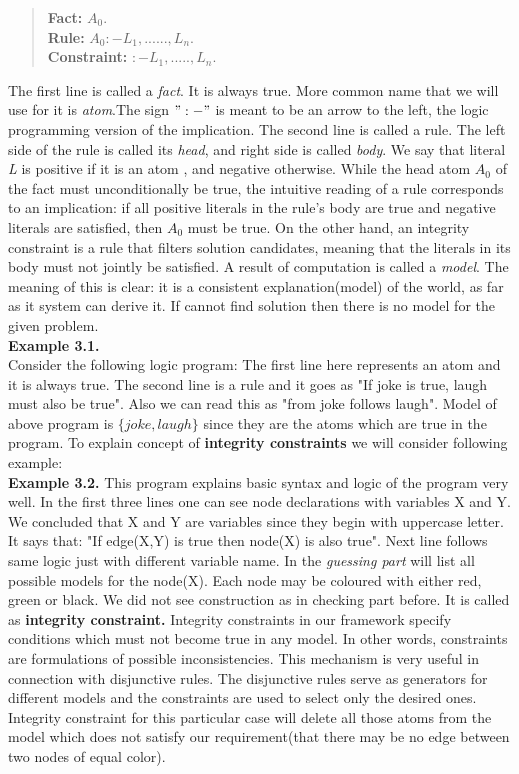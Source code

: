 \documentclass[14pt,a4paper, titlepage]{article}
\begin{document}
\begin{quote} 
\centering 
\textbf{Fact:} $ A_0. $ 
\\ \textbf{Rule:} $ A_0  :-  L_1,......,L_n.$
\\ \textbf{Constraint:} $  :-  L_1,.....,L_n.$
\end{quote}
The first line is called a \textit{fact}. It is always true. More common name that we will use for it is \textit{atom}.The sign $":-"$ is meant to be an arrow to the left, the logic programming version of the implication. 
The second line is called a rule. The left side of the rule is called its \textit{head}, and right side is called \textit{body}.
We say that literal \textit{L} is positive if it is an atom , and negative otherwise. While the head atom $A_0$ of the fact must unconditionally be true, the intuitive reading of a rule corresponds to an implication: if all positive literals in the rule's body are true and negative literals are satisfied, then $A_0$ must be true. On the other hand, an integrity constraint is a rule that filters solution candidates, meaning that the literals in its body must not jointly be satisfied. A result of \dlvhex{} computation is called a \textit{model}. The meaning of this is clear: it is a consistent explanation(model) of the world, as far as it system can derive it. If \dlvhex{} cannot find solution then there is no model for the given problem. \\ \textbf{Example 3.1.} \medskip \\Consider the following logic program: The first line here represents an atom and it is always true. The second line is a rule and it goes as "If joke is true, laugh must also be true". Also we can read this as "from joke follows laugh". Model of above program is $\{joke, laugh\}$ since they are the atoms which are true in the program. To explain concept of \textbf{integrity constraints} we will consider following example:\medskip \\ \textbf{Example 3.2.}
This program explains basic syntax and logic of the program very well. In the first three lines one can see node declarations with variables X and Y. We concluded that X and Y are variables since they begin with uppercase letter. It says that: "If edge(X,Y) is true then node(X) is also true". Next line follows same logic just with different variable name. In the \textit{guessing part} \dlvhex{} will list all possible models for the node(X). Each node may be coloured with either red, green or black. We did not see construction as in checking part before. It is called as \textbf{integrity constraint.} Integrity constraints in our framework specify conditions which must not become true in any model. In other words, constraints are formulations of possible inconsistencies. This mechanism is very useful in connection with disjunctive rules. The disjunctive rules serve as generators for different models and the constraints are used to select only the desired ones. Integrity constraint for this particular case will delete all those atoms from the model which does not satisfy our requirement(that there may be no edge between two nodes of equal color).
\end{document}
